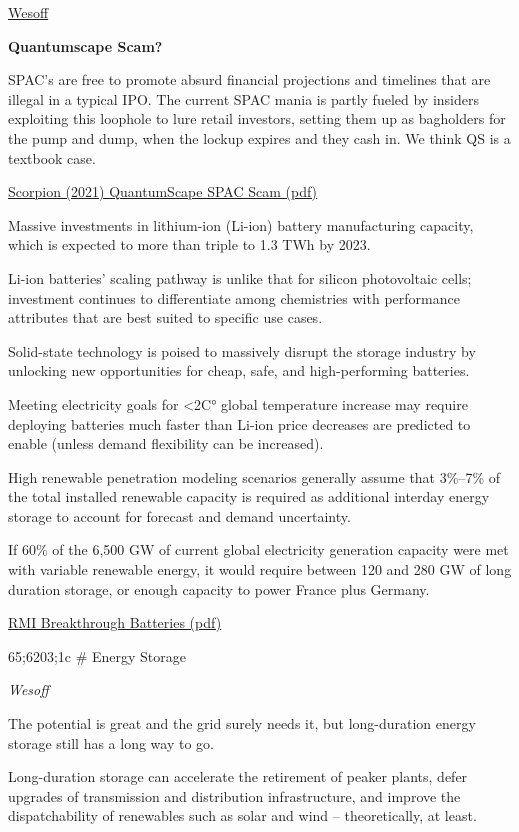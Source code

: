\documentclass[
]{book}
\begin{document}
\href{https://www.canarymedia.com/articles/quantumscapes-billion-dollar-battery-experiment/}{Wesoff}

\textbf{Quantumscape Scam?}

SPAC's are free to promote absurd financial projections and
timelines that are illegal in a typical IPO. The current SPAC
mania is partly fueled by insiders exploiting this loophole to
lure retail investors, setting them up as bagholders for the
pump and dump, when the lockup expires and they cash in.
We think QS is a textbook case.

\href{pdf/Scorpion_2021_Quantumscape.pdf}{Scorpion (2021) QuantumScape SPAC Scam (pdf)}

Massive investments in lithium-ion (Li-ion) battery manufacturing capacity,
which is expected to more than triple to 1.3 TWh by 2023.

Li-ion batteries' scaling pathway is unlike that for silicon
photovoltaic cells; investment continues to differentiate
among chemistries with performance attributes that are
best suited to specific use cases.

Solid-state technology is poised to massively disrupt
the storage industry by unlocking new opportunities for
cheap, safe, and high-performing batteries.

Meeting electricity goals for \textless2C° global temperature increase
may require deploying batteries much faster than Li-ion price decreases
are predicted to enable (unless demand flexibility can be increased).

High renewable penetration modeling scenarios generally assume that
3\%--7\% of the total installed renewable capacity is required as additional
interday energy storage to account for forecast and demand uncertainty.

If 60\% of the 6,500 GW of current global electricity generation capacity
were met with variable renewable energy, it would require between 120
and 280 GW of long duration storage, or enough capacity to power France
plus Germany.

\href{pdf/rmi_breakthrough_batteries.pdf}{RMI Breakthrough Batteries (pdf)}

65;6203;1c
\# Energy Storage

\emph{Wesoff}

The potential is great and the grid surely needs it, but long-duration energy storage still has a long way to go.

Long-duration storage can accelerate the retirement of peaker plants, defer upgrades of transmission and distribution infrastructure, and improve the dispatchability of renewables such as solar and wind -- theoretically, at least.
\end{document}
